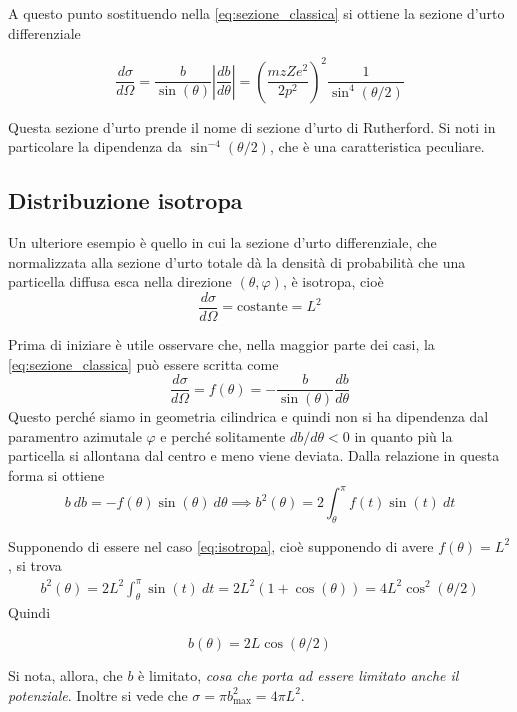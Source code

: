 A questo punto sostituendo nella \eqref{eq:sezione_classica} si ottiene la sezione d'urto differenziale 
\begin{tcolorbox}[colback=black!5!white, colframe=black!45!white, boxrule=0.8pt]
\begin{equation}
    \frac{d\sigma}{d\Omega} = \frac{b}{\sin(\theta)} \left|\frac{db}{d\theta}\right| = \left(\frac{m zZ e^2}{2 p^2}\right)^{2} \frac{1}{\sin^4(\theta/2)}
\end{equation}
\end{tcolorbox}
Questa sezione d'urto prende il nome di sezione d'urto di Rutherford. Si noti in particolare la dipendenza da $\sin^{-4}(\theta/2)$, che è una caratteristica peculiare.

\subsection*{Distribuzione isotropa}

Un ulteriore esempio è quello in cui la sezione d’urto differenziale, che normalizzata alla sezione d’urto totale dà la densità di probabilità che una particella diffusa esca nella direzione $(\theta,\varphi)$, è isotropa, cioè 
\begin{equation}
\label{eq:isotropa}
    \frac{d\sigma}{d\Omega} = \text{costante} = L^2
\end{equation}

Prima di iniziare è utile osservare che, nella maggior parte dei casi, la \eqref{eq:sezione_classica} può essere scritta come 
\begin{equation}
    \frac{d\sigma}{d\Omega}  = f(\theta) = - \frac{b}{\sin(\theta)} \frac{db}{d\theta}
\end{equation}
Questo perché siamo in geometria cilindrica e quindi non si ha dipendenza dal paramentro azimutale $\varphi$ e perché solitamente $db/d\theta < 0$ in quanto più la particella si allontana dal centro e meno viene deviata. Dalla relazione in questa forma si ottiene  
\begin{equation}
    b \ db = - f(\theta) \sin(\theta) \ d\theta \implies b^2(\theta) = 2 \int_{\theta}^{\pi} f(t) \sin(t) \ dt
\end{equation}

Supponendo di essere nel caso \eqref{eq:isotropa}, cioè supponendo di avere $f(\theta) = L^2$, si trova
\begin{align*}
    b^2(\theta) = 2L^2 \int_{\theta}^{\pi} \sin(t) \ dt = 2L^2 (1 + \cos(\theta)) = 4 L^2 \cos^2(\theta/2)
\end{align*}
Quindi 
\begin{tcolorbox}[colback=black!5!white, colframe=black!45!white, boxrule=0.8pt]
\begin{equation}
    b(\theta) = 2L \cos(\theta/2)
\end{equation}
\end{tcolorbox}
Si nota, allora, che $b$ è limitato, \emph{cosa che porta ad essere limitato anche il potenziale}. Inoltre si vede che $\sigma = \pi b_{\text{max}}^2 = 4\pi L^2$.  

